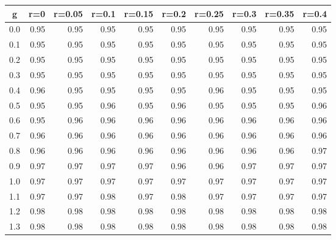 %
\begin{table}[!tbp]
 \begin{center}
 \begin{tabular}{rrrrrrrrrr}\hline\hline
\multicolumn{1}{c}{g}&\multicolumn{1}{c}{r=0}&\multicolumn{1}{c}{r=0.05}&\multicolumn{1}{c}{r=0.1}&\multicolumn{1}{c}{r=0.15}&\multicolumn{1}{c}{r=0.2}&\multicolumn{1}{c}{r=0.25}&\multicolumn{1}{c}{r=0.3}&\multicolumn{1}{c}{r=0.35}&\multicolumn{1}{c}{r=0.4}\tabularnewline
\hline
0.0&0.95&0.95&0.95&0.95&0.95&0.95&0.95&0.95&0.95\tabularnewline
0.1&0.95&0.95&0.95&0.95&0.95&0.95&0.95&0.95&0.95\tabularnewline
0.2&0.95&0.95&0.95&0.95&0.95&0.95&0.95&0.95&0.95\tabularnewline
0.3&0.95&0.95&0.95&0.95&0.95&0.95&0.95&0.95&0.95\tabularnewline
0.4&0.96&0.95&0.95&0.95&0.95&0.96&0.95&0.95&0.95\tabularnewline
0.5&0.95&0.95&0.96&0.95&0.96&0.95&0.95&0.95&0.96\tabularnewline
0.6&0.95&0.96&0.96&0.96&0.96&0.96&0.96&0.96&0.96\tabularnewline
0.7&0.96&0.96&0.96&0.96&0.96&0.96&0.96&0.96&0.96\tabularnewline
0.8&0.96&0.96&0.96&0.96&0.96&0.96&0.96&0.96&0.97\tabularnewline
0.9&0.97&0.97&0.97&0.97&0.96&0.96&0.97&0.97&0.97\tabularnewline
1.0&0.97&0.97&0.97&0.97&0.97&0.97&0.97&0.97&0.97\tabularnewline
1.1&0.97&0.97&0.98&0.97&0.98&0.97&0.97&0.97&0.97\tabularnewline
1.2&0.98&0.98&0.98&0.98&0.98&0.98&0.98&0.98&0.98\tabularnewline
1.3&0.98&0.98&0.98&0.98&0.98&0.98&0.98&0.98&0.98\tabularnewline
\hline
\end{tabular}

\end{center}

\end{table}

